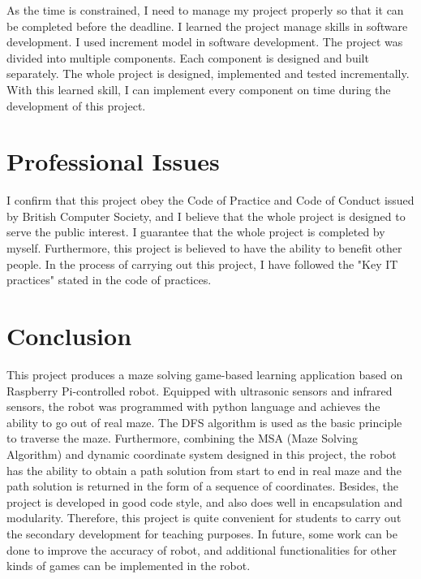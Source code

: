 \documentclass[11pt,times,oneside,openright,hardcopy]{eeereport}
\begin{document}
As the time is constrained, I need to manage my project properly so that it can be completed before the deadline. I learned the project manage skills in software development.
I used increment model in software development.  The project was divided into multiple components. Each component is designed and built separately. The whole project is designed, implemented and tested incrementally.
With this learned skill, I can implement every component on time during the development of this project.


\chapter{Professional Issues}
I confirm that this project obey the Code of Practice and Code of Conduct issued by British Computer Society,
and I believe that the whole project is designed to serve the public interest. 
I guarantee that the whole project is completed by myself. Furthermore, this project is believed to have the ability to benefit other people.
In the process of carrying out this project, I have followed the "Key IT practices" stated in the code of practices.



\chapter{Conclusion}
This project produces a maze solving game-based learning application based on Raspberry Pi-controlled robot.
Equipped with ultrasonic sensors and infrared sensors, the robot was programmed with python language and achieves the ability to go out of real maze.
The DFS algorithm is used as the basic principle to traverse the maze. Furthermore, combining the MSA (Maze Solving Algorithm) and dynamic coordinate system designed in this project,
the robot has the ability to obtain a path solution from start to end in real maze and the path solution is returned in the form of a sequence of coordinates.
Besides, the project is developed in good code style, and also does well in encapsulation and modularity. Therefore, this project is quite convenient for students to carry out the secondary development for teaching purposes.
In future, some work can be done to improve the accuracy of robot, and additional functionalities for other kinds of games can be implemented in the robot.



\end{document}
